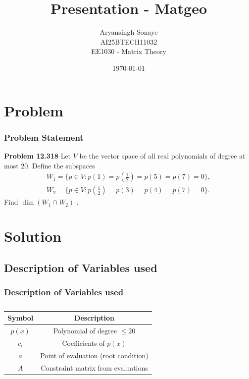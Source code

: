 \documentclass{beamer}
\title{Presentation - Matgeo}
\author{Aryansingh Sonaye \\
AI25BTECH11032 \\
EE1030 - Matrix Theory}
\date{\today}
\theoremstyle{remark}
\numberwithin{equation}{section}
\begin{document}
\begin{frame}
\titlepage
\end{frame}

\section{Problem}
\begin{frame}
\frametitle{Problem Statement}
\textbf{Problem 12.318}
Let $V$ be the vector space of all real polynomials of degree at most $20$. 
Define the subspaces
\begin{align}
W_1 = \{ p \in V : p(1)=p(\tfrac12)=p(5)=p(7)=0 \}, \\
W_2 = \{ p \in V : p(\tfrac12)=p(3)=p(4)=p(7)=0 \}.
\end{align}
Find $\dim(W_1 \cap W_2)$ .


\end{frame}

\section{Solution}
\subsection{Description of Variables used}
\begin{frame}
\frametitle{Description of Variables used}
\begin{table}[H]
\centering
\begin{tabular}{|c|c|}
\hline
Symbol & Description \\
\hline
$p(x)$ & Polynomial of degree $\leq 20$ \\
$c_i$ & Coefficients of $p(x)$ \\
$a$ & Point of evaluation (root condition) \\
$A$ & Constraint matrix from evaluations \\
\hline
\end{tabular}
\caption{} \label{}
\end{table}


\end{frame}
\end{document}

